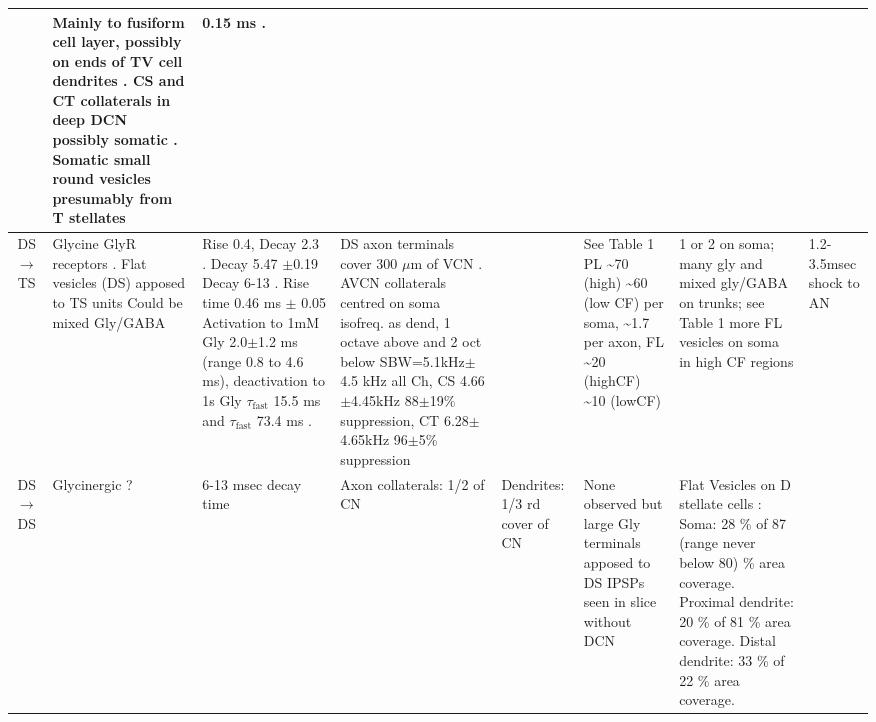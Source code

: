 \begin{longtable}{cXXXXXXX}
& %
Mainly to fusiform cell layer, possibly on ends of TV cell dendrites \citep[mouse][]{OertelWuEtAl:1990}. 
CS and CT collaterals in deep DCN possibly somatic \citep[guinea pig][]{PalmerWallaceEtAl:2003}.
Somatic small round vesicles presumably from T stellates  \citep[guinea pig][]{Alibardi:1999}   
& %
0.15 ms \citep[min EPSP latency to VCN Glutamate puffs, main excitation at 0.3 ms, AN shock produces late EPSPs about 3 msec][]{ZhangOertel:1993}.
\\ \midrule
DS\ensuremath{\rightarrow}TS                        
& %
Glycine GlyR receptors \citep[mouse][]{FerragamoGoldingEtAl:1998a}.
Flat vesicles (DS) apposed to TS units \citep[cat][]{SmithRhode:1989}     
Could be mixed Gly/GABA \citep{AltschulerJuizEtAl:1993} 
& %
Rise 0.4, Decay 2.3 \citep[half width of glyc mIPSCs, MNTB rat][]{AwatramaniTurecekEtAl:2005}.
Decay  5.47 $\pm$0.19 \citep[very young MNTB rat][]{AwatramaniTurecekEtAl:2005}
Decay 6-13 \citep[Slice prep 30 C degrees; VCN guinea pig][]{HartyManis:1998}.
Rise time 0.46 ms $\pm$ 0.05 \citep[spontaneous mIPSCs in AVCN bushy cells, mouse]{LimOleskevichEtAl:2003}
Activation to 1mM Gly 2.0$\pm$1.2 ms (range 0.8 to 4.6 ms), deactivation to 1s Gly $\tau_{\textrm{fast}}$ 15.5 ms and $\tau_{\textrm{fast}}$ 73.4 ms \citep[MNTB mouse][]{LeaoOleskevichEtAl:2004}.
& %
DS axon terminals cover 300 $\mu$m of VCN \citep[mouse][]{OertelWuEtAl:1990}.
AVCN collaterals centred on soma isofreq. as dend, 1 octave above and 2 oct below \citep[gerbil][]{ArnottWallaceEtAl:2004} 
SBW=5.1kHz$\pm$4.5 kHz all Ch, CS 4.66$\pm$4.45kHz 88$\pm$19\% suppression, CT 6.28$\pm$ 4.65kHz    96$\pm$5\% suppression \citep{RhodeGreenberg:1994b}
& %
 
& %
\citep{FerragamoGoldingEtAl:1998a} 
See Table 1 \citep{SmithRhode:1989} 
PL \~{}70 (high) \~{}60 (low CF) per soma, \~{}1.7 per axon, FL \~{}20 (highCF)
               \~{}10 (lowCF) \citep{JosephsonMorest:1998}                

& %
1 or 2 on soma; many gly and mixed gly/GABA on trunks; see Table 1\citep{SmithRhode:1989} more FL
    vesicles on soma in high CF regions \citep{JosephsonMorest:1998}      
& 
1.2-3.5msec shock to AN \citep{FerragamoGoldingEtAl:1998a,NeedhamPaolini:2003} \citep{Oertel:1983}
\\ \midrule
DS\ensuremath{\rightarrow}DS                        
& %
Glycinergic                   \citep{FerragamoGoldingEtAl:1998a}?                    
& %
6-13 msec decay time \citep{AwatramaniTurecekEtAl:2005,HartyManis:1996,HartyManis:1998,LeaoOleskevichEtAl:2004}
& %
Axon collaterals: 1/2 of CN
& %
Dendrites: 1/3 rd cover of CN
& %
None observed but large Gly terminals apposed to DS \citep[cat][]{SmithRhode:1989} 
IPSPs seen in slice without DCN \citep{FerragamoGoldingEtAl:1998a}                     
&    
Flat Vesicles on D stellate cells \citep[cat][]{SmithRhode:1989}:
Soma: 28 \%  of 87 (range never below 80) \% area coverage. 
Proximal dendrite: 20 \%  of 81 \% area coverage.  
Distal dendrite: 33 \%  of 22 \% area coverage.   


\end{longtable}
